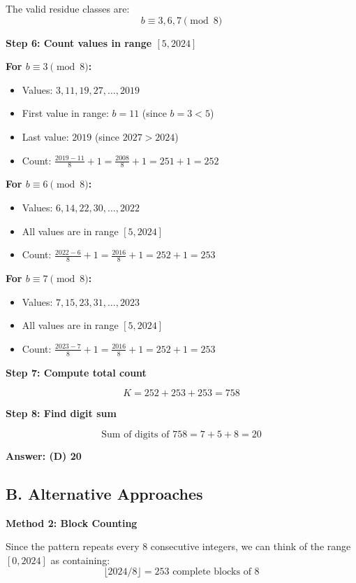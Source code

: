 \documentclass[11pt]{article}
\begin{document}
\begin{solutionbox}
The valid residue classes are:
\[
b \equiv 3, 6, 7 \pmod{8}
\]

\textbf{Step 6: Count values in range $[5, 2024]$}

\textbf{For $b \equiv 3 \pmod{8}$:}
\begin{itemize}
    \item Values: $3, 11, 19, 27, \ldots, 2019$
    \item First value in range: $b = 11$ (since $b = 3 < 5$)
    \item Last value: $2019$ (since $2027 > 2024$)
    \item Count: $\frac{2019 - 11}{8} + 1 = \frac{2008}{8} + 1 = 251 + 1 = 252$
\end{itemize}

\textbf{For $b \equiv 6 \pmod{8}$:}
\begin{itemize}
    \item Values: $6, 14, 22, 30, \ldots, 2022$
    \item All values are in range $[5, 2024]$
    \item Count: $\frac{2022 - 6}{8} + 1 = \frac{2016}{8} + 1 = 252 + 1 = 253$
\end{itemize}

\textbf{For $b \equiv 7 \pmod{8}$:}
\begin{itemize}
    \item Values: $7, 15, 23, 31, \ldots, 2023$
    \item All values are in range $[5, 2024]$
    \item Count: $\frac{2023 - 7}{8} + 1 = \frac{2016}{8} + 1 = 252 + 1 = 253$
\end{itemize}

\textbf{Step 7: Compute total count}

\[
K = 252 + 253 + 253 = 758
\]

\textbf{Step 8: Find digit sum}

\[
\text{Sum of digits of } 758 = 7 + 5 + 8 = 20
\]

\textbf{Answer: (D) 20}

\subsection*{B. Alternative Approaches}

\textbf{Method 2: Block Counting}

Since the pattern repeats every 8 consecutive integers, we can think of the range $[0, 2024]$ as containing:
\[
\lfloor 2024/8 \rfloor = 253 \text{ complete blocks of 8}
\]


\end{solutionbox}
\end{document}
